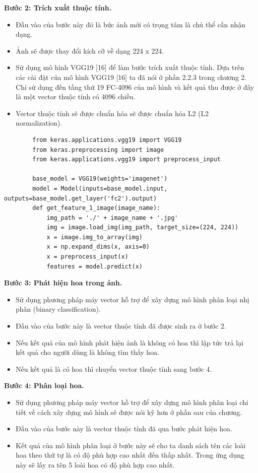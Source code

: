 \documentclass[12pt]{report}
\begin{document}
		\textbf{Bước 2: Trích xuất thuộc tính.} 
		\begin{itemize}
			\item Đầu vào của bước này đó là bức ảnh mới có trọng tâm là chủ thể cần nhận dạng.
			\item Ảnh sẽ được thay đổi kích cỡ về dạng 224 x 224.
			\item Sử dụng mô hình VGG19 [16] để làm bước trích xuất thuộc tính. Dựa trên các cài đặt của mô hình VGG19 [16] ta đã nói ở phần 2.2.3 trong chương 2. Chỉ sử dụng đến tầng thứ 19 FC-4096 của mô hình và kết quả thu được ở đây là một vector thuộc tính có 4096 chiều.
			\item Vector thuộc tính sẽ được chuẩn hóa sẽ được chuẩn hóa L2 (L2 normalization).
		\end{itemize}
										
										
		\begin{lstlisting}
		from keras.applications.vgg19 import VGG19
		from keras.preprocessing import image
		from keras.applications.vgg19 import preprocess_input

		base_model = VGG19(weights='imagenet')
		model = Model(inputs=base_model.input,   outputs=base_model.get_layer('fc2').output)
		def get_feature_1_image(image_name):
			img_path = './' + image_name + '.jpg'
			img = image.load_img(img_path, target_size=(224, 224))
			x = image.img_to_array(img)
			x = np.expand_dims(x, axis=0)
			x = preprocess_input(x)
			features = model.predict(x)
		\end{lstlisting}
								
		\textbf{Bước 3: Phát hiện hoa trong ảnh.} 
		\begin{itemize}
			\item Sử dụng phương pháp máy vector hỗ trợ để xây dựng mô hình phân loại nhị phân (binary classification).
			\item Đầu vào của bước này là vector thuộc tính đã được sinh ra ở bước 2.
			\item Nếu kết quả của mô hình phát hiện ảnh là không có hoa thì lập tức trả lại kết quả cho người dùng là không tìm thấy hoa.
			\item Nếu kết quả là có hoa thì chuyển vector thuộc tính sang bước 4.
		\end{itemize}
										
										
		\textbf{Bước 4: Phân loại hoa.} 
		\begin{itemize}
			\item Sử dụng phương pháp máy vector hỗ trợ để xây dựng mô hình phân loại chi tiết về cách xây dựng mô hình sẽ được nói kỹ hơn ở phần sau của chương.
			\item Đầu vào của bước này là vector thuộc tính đã qua bước phát hiện hoa.
			\item Kết quả của mô hình phân loại ở bước này sẽ cho ta danh sách tên các loài hoa theo thứ tự là có độ phù hợp cao nhất đến thấp nhất. Trong ứng dụng này sẽ lấy ra tên 5 loài hoa có độ phù hợp cao nhất.
		\end{itemize}
										
\end{document}
